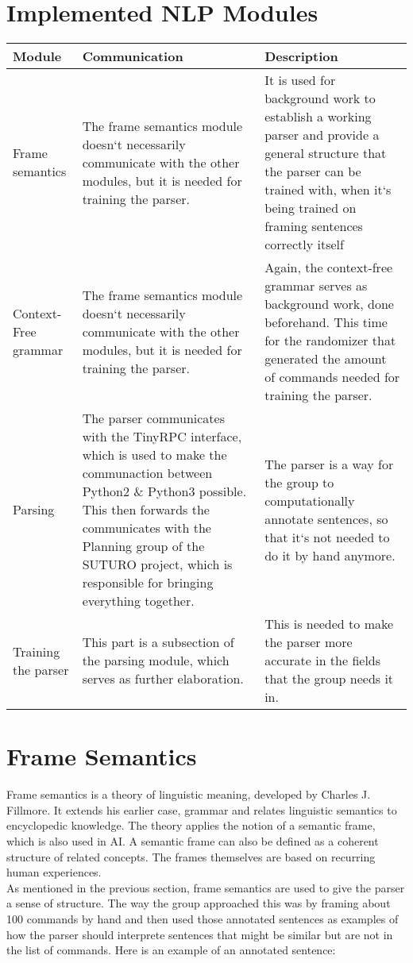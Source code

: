 \documentclass[main.tex]{subfiles}
\begin{document}
	 \section{Implemented NLP Modules}
	 	
	 	\begin{tabular}{ | p{3cm} | p{5cm} | p{5cm} | } 
	 		\hline 
	 		\textbf{Module} & \textbf{Communication} & \textbf{Description} \\ 
	 		\hline 
	 		Frame semantics & The frame semantics  module doesn‘t necessarily communicate with the other modules, but it is needed for training the parser. & It is used for background work to establish a working parser and provide a general structure that the parser can be trained with, when it‘s being trained on framing sentences correctly itself \\ 
	 		\hline 
	 		Context-Free grammar & The frame semantics  module doesn‘t necessarily communicate with the other modules, but it is needed for training the parser. & Again, the context-free grammar serves as background work, done beforehand. This time for the randomizer that generated the amount of commands needed for training the parser. \\
	 		\hline 
	 		Parsing & The parser communicates with the TinyRPC interface, which is used to make the communaction between Python2 \& Python3 possible. This then forwards the communicates with the Planning group of the SUTURO project, which is responsible for bringing everything together. & The parser is a way for the group to computationally annotate sentences, so that it‘s not needed to do it by hand anymore.\\
	 		\hline 
	 		Training the parser & This part is a subsection of the parsing module, which serves as further elaboration. & This is needed to make the parser more accurate in the fields that the group needs it in.\\
	 		\hline 
	 	\end{tabular} 

	
	\section{Frame Semantics}
	Frame semantics is a theory of linguistic meaning, developed by Charles J. Fillmore. It extends his earlier case, grammar and relates linguistic semantics to encyclopedic knowledge. The theory applies the notion of a semantic frame, which is also used in AI. A semantic frame can also be defined as a coherent structure of related concepts. The frames themselves are based on recurring human experiences.\\
As mentioned in the previous section, frame semantics are used to give the parser a sense of structure. The way the group approached this was by framing about 100 commands by hand and then used those annotated sentences as examples of how the parser should interprete sentences that might be similar but are not in the list of commands. 
Here is an example of an annotated sentence: 
\end{document}
